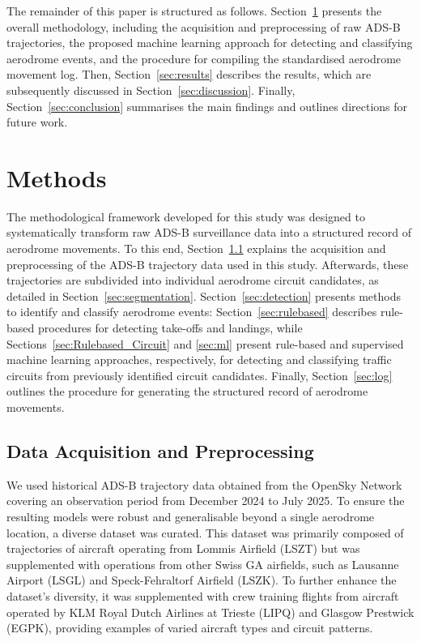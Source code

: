 \documentclass[
  manuscript=proceedings,  %
  layout=preprint,         %
  year=2025,
  volume=x,
]{extra/joas}
\begin{document}
The remainder of this paper is structured as follows. Section~\ref{sec:methods} presents the overall methodology, including the acquisition and preprocessing of raw ADS-B trajectories, the proposed machine learning approach for detecting and classifying aerodrome events, and the procedure for compiling the standardised aerodrome movement log. Then, Section~\ref{sec:results} describes the results, which are subsequently discussed in Section~\ref{sec:discussion}. Finally, Section~\ref{sec:conclusion} summarises the main findings and outlines directions for future work.

\section{Methods}
\label{sec:methods}
The methodological framework developed for this study was designed to systematically transform raw ADS-B surveillance data into a structured record of aerodrome movements. To this end, Section~\ref{sec:preprocessing} explains the acquisition and preprocessing of the ADS-B trajectory data used in this study. Afterwards, these trajectories are subdivided into individual aerodrome circuit candidates, as detailed in Section~\ref{sec:segmentation}. Section~\ref{sec:detection} presents methods to identify and classify aerodrome events: Section~\ref{sec:rulebased} describes rule-based procedures for detecting take-offs and landings, while Sections~\ref{sec:Rulebased_Circuit} and \ref{sec:ml} present rule-based and supervised machine learning approaches, respectively, for detecting and classifying traffic circuits from previously identified circuit candidates. Finally, Section~\ref{sec:log} outlines the procedure for generating the structured record of aerodrome movements.

\subsection{Data Acquisition and Preprocessing}
\label{sec:preprocessing}
We used historical ADS-B trajectory data obtained from the OpenSky Network \cite{opensky_paper} covering an observation period from December 2024 to July 2025. To ensure the resulting models were robust and generalisable beyond a single aerodrome location, a diverse dataset was curated. This dataset was primarily composed of trajectories of aircraft operating from Lommis Airfield (LSZT) but was supplemented with operations from other Swiss GA airfields, such as Lausanne Airport (LSGL) and Speck-Fehraltorf Airfield (LSZK). To further enhance the dataset's diversity, it was supplemented with crew training flights from aircraft operated by KLM Royal Dutch Airlines at Trieste (LIPQ) and Glasgow Prestwick (EGPK), providing examples of varied aircraft types and circuit patterns.
\end{document}
